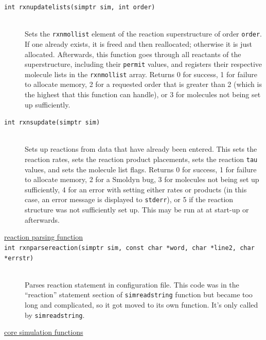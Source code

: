 \documentclass {scrbook}
\newcommand {\ttt} {\texttt}
\begin{document}
\begin{description}
\item[\ttt{int rxnupdatelists(simptr sim, int order)}]
\hfill \\
Sets the \ttt{rxnmollist} element of the reaction superstructure of order \ttt{order}. If one already exists, it is freed and then reallocated; otherwise it is just allocated. Afterwards, this function goes through all reactants of the superstructure, including their \ttt{permit} values, and registers their respective molecule lists in the \ttt{rxnmollist} array. Returns 0 for success, 1 for failure to allocate memory, 2 for a requested order that is greater than 2 (which is the highest that this function can handle), or 3 for molecules not being set up sufficiently.

\item[\ttt{int rxnsupdate(simptr sim)}]
\hfill \\
Sets up reactions from data that have already been entered. This sets the reaction rates, sets the reaction product placements, sets the reaction \ttt{tau} values, and sets the molecule list flags. Returns 0 for success, 1 for failure to allocate memory, 2 for a Smoldyn bug, 3 for molecules not being set up sufficiently, 4 for an error with setting either rates or products (in this case, an error message is displayed to \ttt{stderr}), or 5 if the reaction structure was not sufficiently set up. This may be run at at start-up or afterwards.

\item[\underline{reaction parsing function}]

\item[\ttt{int rxnparsereaction(simptr sim, const char *word, char *line2, char *errstr)}]
\hfill \\
Parses reaction statement in configuration file. This code was in the ``reaction'' statement section of \ttt{simreadstring} function but became too long and complicated, so it got moved to its own function. It's only called by \ttt{simreadstring}.

\item[\underline{core simulation functions}]


\end{description}
\end{document}
